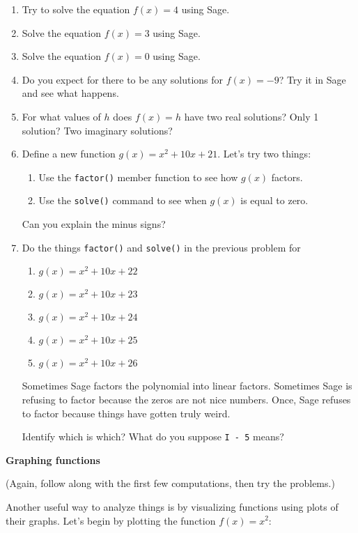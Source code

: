 \begin{enumerate}
	\item Try to solve the equation $f(x)=4$ using Sage.
	\item Solve the equation $f(x)=3$ using Sage.
	\item Solve the equation $f(x)=0$ using Sage.
	\item Do you expect for there to be any solutions for $f(x)=-9$?
		Try it in Sage and see what happens.
	\item For what values of $h$ does $f(x)=h$ have two real solutions?
		Only 1 solution? Two imaginary solutions?
	\item Define a new function $g(x) = x^2 + 10x + 21$.  Let's try two things:
	\begin{enumerate}
		\item Use the \verb+factor()+ member function to see how $g(x)$ factors.
		\item Use the \verb+solve()+ command to see when $g(x)$ is equal to zero.
	\end{enumerate}
	Can you explain the minus signs?

	\item Do the things \verb+factor()+ and \verb+solve()+ in the previous problem for 
	\begin{enumerate}
		\item $g(x) = x^2 + 10x + 22$
		\item $g(x) = x^2 + 10x + 23$
		\item $g(x) = x^2 + 10x + 24$
		\item $g(x) = x^2 + 10x + 25$
		\item $g(x) = x^2 + 10x + 26$
	\end{enumerate}

    Sometimes Sage factors the polynomial into linear factors. \newline
    Sometimes Sage is refusing to factor because the zeros are not nice numbers.\newline
    Once, Sage refuses to factor because things have gotten truly weird.

    Identify which is which?  What do you suppose \verb+I - 5+ means?

\end{enumerate}

{\bf \Large Graphing functions}

(Again, follow along with the first few computations, then try the problems.)

Another useful way to analyze things is by visualizing functions using plots of their graphs. Let's begin by plotting the function $f(x)=x^2$:


